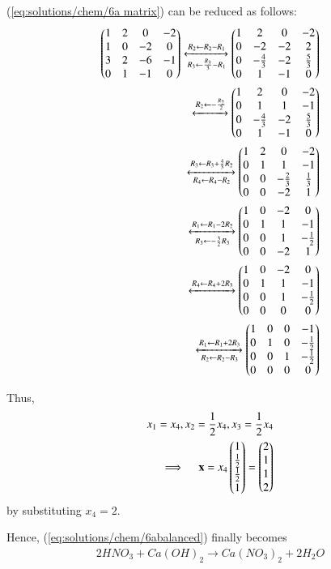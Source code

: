 (\ref{eq:solutions/chem/6a matrix}) can be reduced as follows:
\begin{align}
    \begin{pmatrix}1 & 2 & 0 & -2\\
           1 & 0 & -2 & 0\\
           3 & 2 & -6 & -1\\
           0 & 1 & -1 & 0\end{pmatrix}
    \xleftrightarrow[R_{3}\leftarrow \frac{R_3}{3}-R_{1}]{R_{2}\leftarrow R_2- R_1}
    \begin{pmatrix}1 & 2 & 0 & -2\\
           0 & -2 & -2 & 2\\
           0 & -\frac{4}{3} & -2 & \frac{5}{3}\\
           0 & 1 & -1 & 0\end{pmatrix}\\
    \xleftrightarrow{R_2 \leftarrow -\frac{R_2}{2}}
    \begin{pmatrix}1 & 2 & 0 & -2\\
          0 & 1 & 1 & -1\\
          0 & -\frac{4}{3} & -2 & \frac{5}{3}\\
          0 & 1 & -1 & 0\end{pmatrix}\\
    \xleftrightarrow[R_4 \leftarrow R_4- R_2]{R_3 \leftarrow R_3 + \frac{4}{3}R_2}
    \begin{pmatrix}1 & 2 & 0 & -2\\
           0 & 1 & 1 & -1\\
           0 & 0 & -\frac{2}{3} & \frac{1}{3}\\
           0 & 0 & -2 & 1\end{pmatrix}\\
    \xleftrightarrow[R_3 \leftarrow -\frac{3}{2}R_3]{R_1 \leftarrow R_1- 2R_2}
    \begin{pmatrix}1 & 0 & -2 & 0\\
           0 & 1 & 1 & -1\\
           0 & 0 & 1 & -\frac{1}{2}\\
           0 & 0 & -2 & 1\end{pmatrix}\\
    \xleftrightarrow{R_4\leftarrow R_4 + 2R_3}
    \begin{pmatrix}1 & 0 & -2 & 0\\
           0 & 1 & 1 & -1\\
           0 & 0 & 1 & -\frac{1}{2}\\
           0 & 0 & 0 & 0\end{pmatrix}\\
    \xleftrightarrow[R_2\leftarrow R_2-R_3]{R_1\leftarrow R_1 + 2R_3}
    \begin{pmatrix}1 & 0 & 0 & -1\\
           0 & 1 & 0 & -\frac{1}{2}\\
           0 & 0 & 1 & -\frac{1}{2}\\
           0 & 0 & 0 & 0\end{pmatrix}
\end{align}

Thus,
\begin{align}
    x_1=x_4, x_2= \frac{1}{2}x_4, x_3=\frac{1}{2}x_4\\
    \implies \quad\mathbf{x}= x_4\begin{pmatrix}1\\ \frac{1}{2}\\ \frac{1}{2}\\1\end{pmatrix} =\begin{pmatrix}2\\1\\1\\2\end{pmatrix}
\end{align} 
by substituting $x_4= 2$.

\hfill\break
Hence, (\ref{eq:solutions/chem/6abalanced}) finally becomes
\begin{align}
    2HNO_{3}+ Ca(OH)_{2}\to Ca(NO_{3})_{2}+ 2H_{2}O
\end{align}
